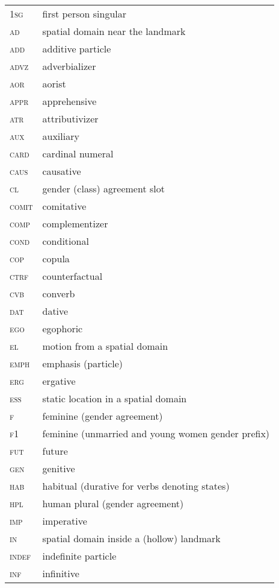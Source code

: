 ﻿\documentclass[output=paper]{langsci/langscibook}
\begin{document}
\begin{longtable}[l]{@{}ll@{}}
\textsc{1sg}	& first person singular \\
\textsc{ad}	& spatial domain near the landmark \\
\textsc{add}	& additive particle \\
\textsc{advz}	& adverbializer \\
\textsc{aor}	& aorist \\
\textsc{appr}	& apprehensive \\
\textsc{atr}	& attributivizer \\
\textsc{aux}	& auxiliary \\
\textsc{card}	& cardinal numeral \\
\textsc{caus}	& causative \\
\textsc{cl}	& gender (class) agreement slot \\
\textsc{comit}	& comitative \\
\textsc{comp}	& complementizer \\
\textsc{cond}	& conditional \\
\textsc{cop}	& copula \\
\textsc{ctrf}	& counterfactual \\
\textsc{cvb}	& converb \\
\textsc{dat}	& dative \\
\textsc{ego}	& egophoric \\
\textsc{el}	& motion from a spatial domain \\
\textsc{emph}	& emphasis (particle) \\
\textsc{erg}	& ergative \\
\textsc{ess}	& static location in a spatial domain \\
\textsc{f}	& feminine (gender agreement) \\
\textsc{f1}	& feminine (unmarried and young women gender prefix) \\
\textsc{fut}	& future \\
\textsc{gen}	& genitive \\
\textsc{hab}	& habitual (durative for verbs denoting states) \\
\textsc{hpl}	& human plural (gender agreement) \\
\textsc{imp}	& imperative \\
\textsc{in}	& spatial domain inside a (hollow) landmark \\
\textsc{indef}	& indefinite particle \\
\textsc{inf}	& infinitive \\

\end{longtable}
\end{document}
